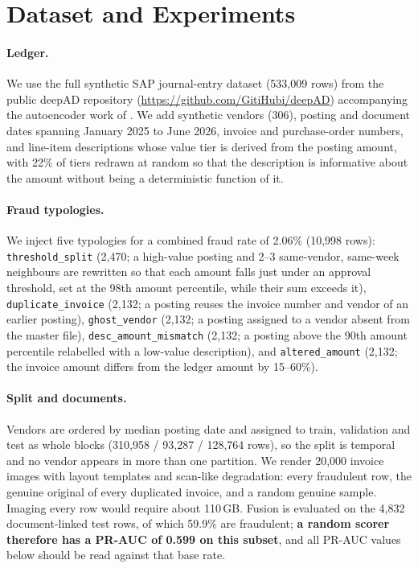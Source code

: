 \documentclass{article}
\newcommand{\typ}[1]{\texttt{#1}}
\begin{document}
\section{Dataset and Experiments}

\paragraph{Ledger.} We use the full synthetic SAP journal-entry dataset (533,009 rows) from the public deepAD repository (\url{https://github.com/GitiHubi/deepAD}) accompanying the autoencoder work of \citet{schreyer2017detection}. We add synthetic vendors (306), posting and document dates spanning January 2025 to June 2026, invoice and purchase-order numbers, and line-item descriptions whose value tier is derived from the posting amount, with 22\% of tiers redrawn at random so that the description is informative about the amount without being a deterministic function of it.

\paragraph{Fraud typologies.} We inject five typologies for a combined fraud rate of 2.06\% (10,998 rows): \typ{threshold\_split} (2,470; a high-value posting and 2--3 same-vendor, same-week neighbours are rewritten so that each amount falls just under an approval threshold, set at the 98th amount percentile, while their sum exceeds it), \typ{duplicate\_invoice} (2,132; a posting reuses the invoice number and vendor of an earlier posting), \typ{ghost\_vendor} (2,132; a posting assigned to a vendor absent from the master file), \typ{desc\_amount\_mismatch} (2,132; a posting above the 90th amount percentile relabelled with a low-value description), and \typ{altered\_amount} (2,132; the invoice amount differs from the ledger amount by 15--60\%).

\paragraph{Split and documents.} Vendors are ordered by median posting date and assigned to train, validation and test as whole blocks (310,958 / 93,287 / 128,764 rows), so the split is temporal and no vendor appears in more than one partition. We render 20,000 invoice images with layout templates and scan-like degradation: every fraudulent row, the genuine original of every duplicated invoice, and a random genuine sample. Imaging every row would require about 110\,GB. Fusion is evaluated on the 4,832 document-linked test rows, of which 59.9\% are fraudulent; \textbf{a random scorer therefore has a PR-AUC of 0.599 on this subset}, and all PR-AUC values below should be read against that base rate.
\end{document}

